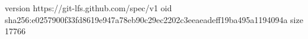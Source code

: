 version https://git-lfs.github.com/spec/v1
oid sha256:e0257900f33fd8619e947a78eb90c29ec2202c3eeaeadeff19ba495a1194094a
size 17766
